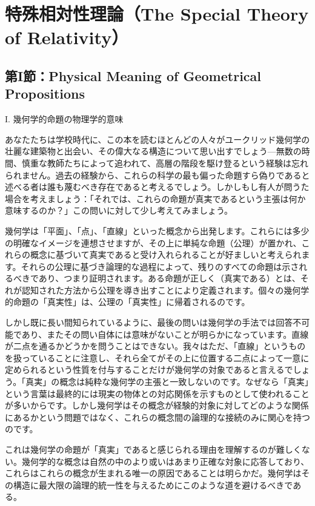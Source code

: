 \documentclass[a4paper,11pt,openany]{ltjsbook}
\begin{document}
\clearpage
\part{特殊相対性理論（The Special Theory of Relativity）}



\clearpage
\chapter{第I節：Physical Meaning of Geometrical Propositions}

I.
幾何学的命題の物理学的意味


あなたたちは学校時代に、この本を読むほとんどの人々がユークリッド幾何学の壮麗な建築物と出会い、その偉大なる構造について思い出すでしょう—無数の時間、慎重な教師たちによって追われて、高層の階段を駆け登るという経験は忘れられません。過去の経験から、これらの科学の最も偏った命題すら偽りであると述べる者は誰も蔑むべき存在であると考えるでしょう。しかしもし有人が問うた場合を考えましょう：「それでは、これらの命題が真実であるという主張は何か意味するのか？」この問いに対して少し考えてみましょう。

幾何学は「平面」、「点」、「直線」といった概念から出発します。これらには多少の明確なイメージを連想させますが、その上に単純な命題（公理）が置かれ、これらの概念に基づいて真実であると受け入れられることが好ましいと考えられます。それらの公理に基づき論理的な過程によって、残りのすべての命題は示されるべきであり、つまり証明されます。ある命題が正しく（真実である）とは、それが認知された方法から公理を導き出すことにより定義されます。個々の幾何学的命題の「真実性」は、公理の「真実性」に帰着されるのです。

しかし既に長い間知られているように、最後の問いは幾何学の手法では回答不可能であり、またその問い自体には意味がないことが明らかになっています。直線が二点を通るかどうかを問うことはできない。我々はただ、「直線」というものを扱っていることに注意し、それら全てがその上に位置する二点によって一意に定められるという性質を付与することだけが幾何学の対象であると言えるでしょう。「真実」の概念は純粋な幾何学の主張と一致しないのです。なぜなら「真実」という言葉は最終的には現実の物体との対応関係を示すものとして使われることが多いからです。しかし幾何学はその概念が経験的対象に対してどのような関係にあるかという問題ではなく、これらの概念間の論理的な接続のみに関心を持つのです。

これは幾何学の命題が「真実」であると感じられる理由を理解するのが難しくない。幾何学的な概念は自然の中のより或いはあまり正確な対象に応答しており、これらはこれらの概念が生まれる唯一の原因であることは明らかだ。幾何学はその構造に最大限の論理的統一性を与えるためにこのような道を避けるべきである。
\end{document}
